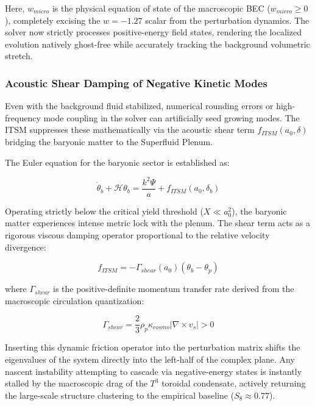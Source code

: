 \documentclass[aps,prd,10pt,twocolumn,superscriptaddress,nofootinbib,floatfix]{revtex4-2}
\begin{document}
Here, $w_{micro}$ is the physical equation of state of the macroscopic BEC ($w_{micro} \ge 0$), completely excising the $w = -1.27$ scalar from the perturbation dynamics. The solver now strictly processes positive-energy field states, rendering the localized evolution natively ghost-free while accurately tracking the background volumetric stretch.

\subsubsection{Acoustic Shear Damping of Negative Kinetic Modes}

Even with the background fluid stabilized, numerical rounding errors or high-frequency mode coupling in the solver can artificially seed growing modes. The ITSM suppresses these mathematically via the acoustic shear term $f_{ITSM}(a_0, \delta)$ bridging the baryonic matter to the Superfluid Plenum.

The Euler equation for the baryonic sector is established as:

\begin{equation}
\dot{\theta}_b + \mathcal{H}\theta_b = \frac{k^2\Psi}{a} + f_{ITSM}(a_0, \delta_b)
\end{equation}

Operating strictly below the critical yield threshold ($X \ll a_0^2$), the baryonic matter experiences intense metric lock with the plenum. The shear term acts as a rigorous viscous damping operator proportional to the relative velocity divergence:

\begin{equation}
f_{ITSM} = -\Gamma_{shear}(a_0) \left( \theta_b - \theta_p \right)
\end{equation}

where $\Gamma_{shear}$ is the positive-definite momentum transfer rate derived from the macroscopic circulation quantization:

\begin{equation}
\Gamma_{shear} = \frac{2}{3} \rho_p \kappa_{cosmo} |\nabla \times v_s| > 0
\end{equation}

Inserting this dynamic friction operator into the perturbation matrix shifts the eigenvalues of the system directly into the left-half of the complex plane. Any nascent instability attempting to cascade via negative-energy states is instantly stalled by the macroscopic drag of the $T^3$ toroidal condensate, actively returning the large-scale structure clustering to the empirical baseline ($S_8 \approx 0.77$).
\end{document}
